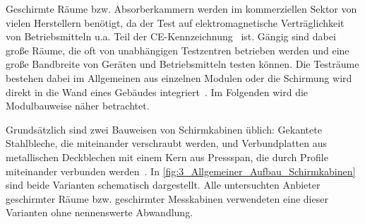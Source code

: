 

Geschirmte Räume bzw. Absorberkammern werden im kommerziellen Sektor von vielen Herstellern benötigt, da der Test auf elektromagnetische Verträglichkeit von Betriebsmitteln u.a. Teil der CE-Kennzeichnung~\cite{Richtlinie_2014/30/EU} ist. Gängig sind dabei große Räume, die oft von unabhängigen Testzentren betrieben werden und eine große Bandbreite von Geräten und Betriebsmitteln testen können. Die Testräume bestehen dabei im Allgemeinen aus einzelnen Modulen oder die Schirmung wird direkt in die Wand eines Gebäudes integriert~\cite{EM_Schirmung}. Im Folgenden wird die Modulbauweise näher betrachtet.
\par
\vspace{\linespace}
Grundsätzlich sind zwei Bauweisen von Schirmkabinen üblich: Gekantete Stahlbleche, die miteinander verschraubt werden, und Verbundplatten aus metallischen Deckblechen mit einem Kern aus Pressspan, die durch Profile miteinander verbunden werden~\cite{EM_Schirmung, Design_of_shielded_enclosures}. In \Abb\ref{fig:3_Allgemeiner_Aufbau_Schirmkabinen} sind beide Varianten schematisch dargestellt. Alle untersuchten Anbieter geschirmter Räume bzw. geschirmter Messkabinen verwendeten eine dieser Varianten ohne nennenswerte Abwandlung.

